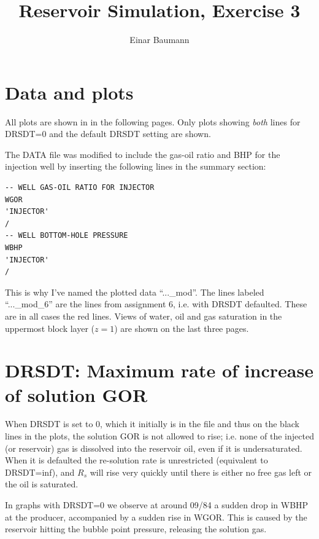 



\title{Reservoir Simulation, Exercise 3}
\author{Einar Baumann}
\maketitle
\thispagestyle{empty}

\section{Data and plots} %
\label{sec:data_and_plots}

All plots are shown in in the following pages. Only plots showing \emph{both} lines for DRSDT=0 and the default DRSDT setting are shown.

The DATA file was modified to include the gas-oil ratio and BHP for the injection well by inserting the following lines in the summary section:
\begin{verbatim}
-- WELL GAS-OIL RATIO FOR INJECTOR
WGOR
'INJECTOR'
/
-- WELL BOTTOM-HOLE PRESSURE
WBHP
'INJECTOR'
/
\end{verbatim}

\noindent This is why I've named the plotted data ``...\_mod''. The lines labeled ``...\_mod\_6'' are the lines from assignment 6, i.e. with DRSDT defaulted. These are in all cases the red lines. Views of water, oil and gas saturation in the uppermost block layer ($z=1$) are shown on the last three pages.

\section{DRSDT: Maximum rate of increase of solution GOR} %
\label{sec:drsdt_maximum_rate_of_increase_of_solution_gor}

When DRSDT is set to 0, which it initially is in the file and thus on the black lines in the plots, the solution GOR is not allowed to rise; i.e. none of the injected (or reservoir) gas is dissolved into the reservoir oil, even if it is undersaturated. When it is defaulted the re-solution rate is unrestricted (equivalent to DRSDT=inf), and $R_s$ will rise very quickly until there is either no free gas left or the oil is saturated.

In graphs with DRSDT=0 we observe at around 09/84 a sudden drop in WBHP at the producer, accompanied by a sudden rise in WGOR. This is caused by the reservoir hitting the bubble point pressure, releasing the solution gas.

